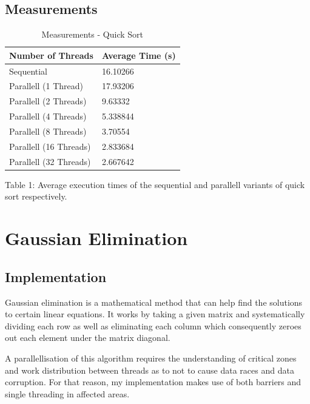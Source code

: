 \documentclass[a4]{article}
\begin{document}
\subsection{Measurements}

\begin{table}[H]
	\caption{Measurements - Quick Sort}
	\begin{center}
		\begin{tabular}{ | m{10em} | m{8em} |} 
			\hline
			Number of Threads & Average Time (s) \\
			\hline
			\hline
			Sequential & 16.10266 \\
			\hline
			\hline
			Parallell (1 Thread) & 17.93206 \\
			Parallell (2 Threads) & 9.63332 \\
			Parallell (4 Threads) & 5.338844 \\
			Parallell (8 Threads) & 3.70554 \\
			Parallell (16 Threads) & 2.833684 \\
			Parallell (32 Threads) & 2.667642 \\
			\hline
		\end{tabular}
	\end{center}
	\begin{tablenotes}
		\small
		\item Table 1: Average execution times of the sequential and parallell variants of quick sort respectively. 
	\end{tablenotes}
\end{table}

\section{Gaussian Elimination}

\subsection{Implementation}

Gaussian elimination is a mathematical method that can help find the solutions to certain linear equations. It works
by taking a given matrix and systematically dividing each row as well as eliminating each column which consequently
zeroes out each element under the matrix diagonal.

A parallellisation of this algorithm requires the understanding of critical zones and work distribution between threads
as to not to cause data races and data corruption. For that reason, my implementation makes use of both barriers and single
threading in affected areas.
\end{document}
